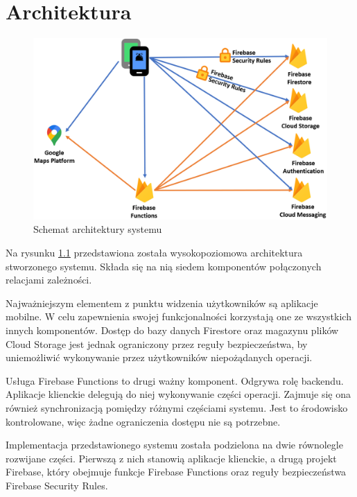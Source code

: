\chapter{Architektura}

\begin{figure}[ht]
  \centering
  \includegraphics[width=\linewidth]{images/architecture.png}
  \caption{Schemat architektury systemu}
  \label{fig:architecture}
\end{figure}

Na rysunku \ref{fig:architecture} przedstawiona została wysokopoziomowa architektura stworzonego systemu. Składa się na nią siedem komponentów połączonych relacjami zależności.

Najważniejszym elementem z punktu widzenia użytkowników są aplikacje mobilne. W celu zapewnienia swojej funkcjonalności korzystają one ze wszystkich innych komponentów. Dostęp do bazy danych Firestore oraz magazynu plików Cloud Storage jest jednak ograniczony przez reguły bezpieczeństwa, by uniemożliwić wykonywanie przez użytkowników niepożądanych operacji.

Usługa Firebase Functions to drugi ważny komponent. Odgrywa rolę backendu. Aplikacje klienckie delegują do niej wykonywanie części operacji. Zajmuje się ona również synchronizacją pomiędzy różnymi częściami systemu. Jest to środowisko kontrolowane, więc żadne ograniczenia dostępu nie są potrzebne.

Implementacja przedstawionego systemu została podzielona na dwie równolegle rozwijane części. Pierwszą z nich stanowią aplikacje klienckie, a drugą projekt Firebase, który obejmuje funkcje Firebase Functions oraz reguły bezpieczeństwa Firebase Security Rules.

